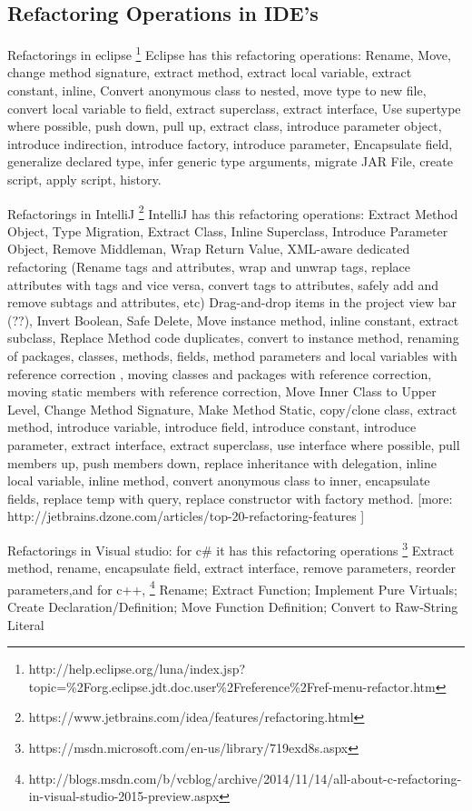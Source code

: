 \subsection{Refactoring Operations in IDE's}

Refactorings in eclipse \footnote{http://help.eclipse.org/luna/index.jsp?topic=\%2Forg.eclipse.jdt.doc.user\%2Freference\%2Fref-menu-refactor.htm}
Eclipse has this refactoring operations: Rename, Move, change method signature, extract method, extract local variable, extract constant, inline, Convert anonymous class to nested, move type to new file, convert local variable to field, extract superclass, extract interface, Use supertype where possible, push down, pull up, extract class, introduce parameter object, introduce indirection, introduce factory, introduce parameter, Encapsulate field, generalize declared type, infer generic type arguments, migrate JAR File, create script, apply script, history.


Refactorings in IntelliJ \footnote{https://www.jetbrains.com/idea/features/refactoring.html} IntelliJ has this refactoring operations: Extract Method Object, Type Migration, Extract Class, Inline Superclass, Introduce Parameter Object, Remove Middleman, Wrap Return Value, XML-aware dedicated refactoring (Rename tags and attributes, wrap and unwrap tags, replace attributes with tags and vice versa, convert tags to attributes, safely add and remove subtags and attributes, etc) Drag-and-drop items in the project view bar (??), Invert Boolean, Safe Delete, Move instance method, inline constant, extract subclass, Replace Method code duplicates, convert to instance method, renaming of packages, classes, methods, fields, method parameters and local variables with reference correction , moving classes and packages with reference correction, moving static members with reference correction, Move Inner Class to Upper Level, Change Method Signature, Make Method Static, copy/clone class, extract method, introduce variable, introduce field, introduce constant, introduce parameter, extract interface, extract superclass, use interface where possible, pull members up, push members down, replace inheritance with delegation, inline local variable, inline method, convert anonymous class to inner, encapsulate fields, replace temp with query, replace constructor with factory method. [more: http://jetbrains.dzone.com/articles/top-20-refactoring-features ]

Refactorings in Visual studio: for c\# it has this refactoring operations \footnote{https://msdn.microsoft.com/en-us/library/719exd8s.aspx} Extract method, rename, encapsulate field, extract interface, remove parameters, reorder parameters,and for c++, \footnote{http://blogs.msdn.com/b/vcblog/archive/2014/11/14/all-about-c-refactoring-in-visual-studio-2015-preview.aspx}    Rename;  Extract Function;  Implement Pure Virtuals; Create Declaration/Definition; Move Function Definition; Convert to Raw-String Literal



